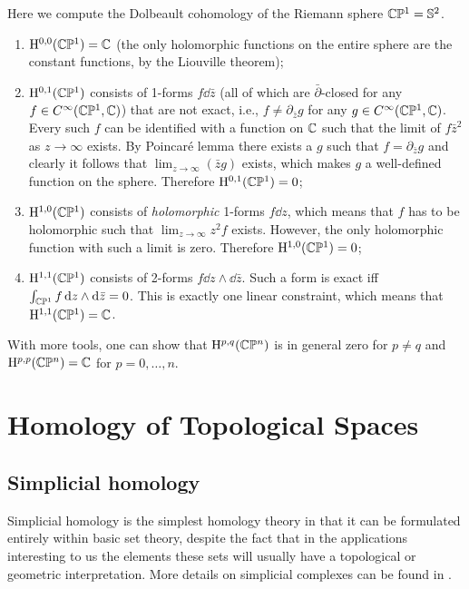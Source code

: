 \begin{example}
    Here we compute the Dolbeault cohomology of the Riemann sphere $\mathbb{C}\mathbb{P}^1=\mathbb{S}^2$.
    \begin{enumerate}
        \item $\mathrm{H}^{0,0}(\mathbb{C}\mathbb{P}^1)=\mathbb{C}$ (the only holomorphic functions on the entire sphere are the constant functions, by the Liouville theorem);
        \item $\mathrm{H}^{0,1}(\mathbb{C}\mathbb{P}^1)$ consists of 1-forms $f\dd\bar z$ (all of which are $\bar\partial$-closed for any $f\in C^\infty(\mathbb{C}\mathbb{P}^1,\mathbb{C})$) that are not exact, i.e., $f\neq \partial_{\bar z} g$ for any $g\in C^\infty(\mathbb{C}\mathbb{P}^1,\mathbb{C})$. Every such $f$ can be identified with a function on $\mathbb{C}$ such that the limit of $f \bar z^2$ as $z\to\infty$ exists. By Poincar\'e lemma there exists a $g$ such that $f=\partial_{\bar z} g$ and clearly it follows that $\lim_{z\to\infty}(\bar zg)$ exists, which makes $g$ a well-defined function on the sphere. Therefore $\mathrm{H}^{0,1}(\mathbb{C}\mathbb{P}^1)=0$;
        \item $\mathrm{H}^{1,0}(\mathbb{C}\mathbb{P}^1)$ consists of \emph{holomorphic} 1-forms $f\dd z$, which means that $f$ has to be holomorphic such that $\lim_{z\to\infty}z^2f$ exists. However, the only holomorphic function with such a limit is zero. Therefore $\mathrm{H}^{1,0}(\mathbb{C}\mathbb{P}^1)=0$;
        \item $\mathrm{H}^{1,1}(\mathbb{C}\mathbb{P}^1)$ consists of 2-forms $f\dd z\wedge\dd\bar z$. Such a form is exact iff $\int_{\mathbb{C}\mathbb{P}^1}f\mathop{}\!\mathrm{d} z\wedge\mathop{}\!\mathrm{d} \bar z=0$. This is exactly one linear constraint, which means that $\mathrm{H}^{1,1}(\mathbb{C}\mathbb{P}^1)=\mathbb{C}$.
    \end{enumerate}
    With more tools, one can show that $\mathrm{H}^{p,q}(\mathbb{C}\mathbb{P}^n)$ is in general zero for $p\neq q$ and $\mathrm{H}^{p,p}(\mathbb{C}\mathbb{P}^n)=\mathbb{C}$ for $p=0,\ldots,n$.
\end{example}




\clearpage
\chapter{Homology of Topological Spaces}


\section{Simplicial homology}

Simplicial homology is the simplest homology theory in that it can be formulated entirely within basic set theory, despite the fact that in the applications interesting to us the elements these sets will usually have a topological or geometric interpretation. More details on simplicial complexes can be found in \cite{tomDieck}.


